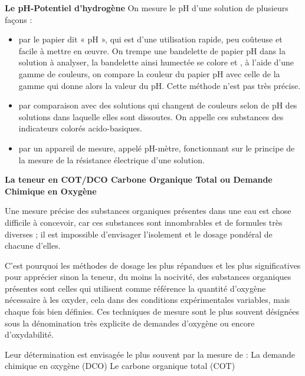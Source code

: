 \textbf{Le pH-Potentiel d’hydrogène}
On mesure le pH d’une solution de plusieurs façons :
\begin{itemize}
  
\item par le papier dit « pH », qui est d’une utilisation rapide, peu coûteuse et facile à mettre en œuvre. On trempe une bandelette de papier pH dans la solution à analyser, la bandelette ainsi humectée se colore et , à l’aide d’une gamme de couleurs, on compare la couleur du papier pH avec celle de la gamme qui donne alors la valeur du pH. Cette méthode n’est pas très précise.
\item par comparaison avec des solutions qui changent de couleurs selon de pH des solutions dans laquelle elles sont dissoutes. On appelle ces substances des indicateurs colorés acido-basiques.
\item par un appareil de mesure, appelé pH-mètre, fonctionnant sur le principe de la mesure de la résistance électrique d’une solution.

  
\end{itemize}


\vspace{0.3cm}
\textbf{La teneur en COT/DCO Carbone Organique Total ou Demande Chimique en Oxygène}
\vspace{0.3cm}


Une mesure précise des substances organiques présentes dans une eau est chose difficile à concevoir, car ces substances sont innombrables et de formules très diverses ; il est impossible d’envisager l’isolement et le dosage pondéral de chacune d’elles.
\vspace{0.3cm}

C’est pourquoi les méthodes de dosage les plus répandues et les plus significatives pour apprécier sinon la teneur, du moins la nocivité, des substances organiques présentes sont celles qui utilisent comme référence la quantité d’oxygène nécessaire à les oxyder, cela dans des conditions expérimentales variables, mais chaque fois bien définies. Ces techniques de mesure sont le plus souvent désignées sous la dénomination très explicite de demandes d’oxygène ou encore d’oxydabilité.
\vspace{0.3cm}

Leur détermination est envisagée le plus souvent par la mesure de :
	La demande chimique en oxygène (DCO)
	Le carbone organique total (COT)


\vspace{0.3cm}

